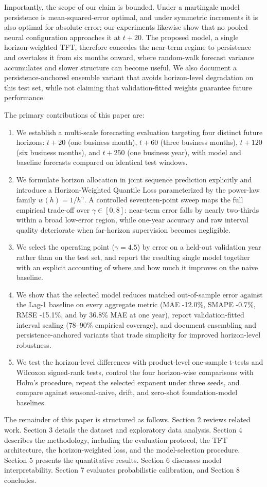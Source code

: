 \documentclass[review,3p,times]{elsarticle}
\begin{document}
Importantly, the scope of our claim is bounded. Under a martingale model persistence is mean-squared-error optimal, and under symmetric increments it is also optimal for absolute error; our experiments likewise show that no pooled neural configuration approaches it at $t+20$. The proposed model, a single horizon-weighted TFT, therefore concedes the near-term regime to persistence and overtakes it from six months onward, where random-walk forecast variance accumulates and slower structure can become useful. We also document a persistence-anchored ensemble variant that avoids horizon-level degradation on this test set, while not claiming that validation-fitted weights guarantee future performance.

The primary contributions of this paper are:
\begin{enumerate}
\item We establish a multi-scale forecasting evaluation targeting four distinct future horizons: $t+20$ (one business month), $t+60$ (three business months), $t+120$ (six business months), and $t+250$ (one business year), with model and baseline forecasts compared on identical test windows.
\item We formulate horizon allocation in joint sequence prediction explicitly and introduce a Horizon-Weighted Quantile Loss parameterized by the power-law family $w(h) = 1/h^\gamma$. A controlled seventeen-point sweep maps the full empirical trade-off over $\gamma \in [0, 8]$: near-term error falls by nearly two-thirds within a broad low-error region, while one-year accuracy and raw interval quality deteriorate when far-horizon supervision becomes negligible.
\item We select the operating point ($\gamma = 4.5$) by error on a held-out validation year rather than on the test set, and report the resulting single model together with an explicit accounting of where and how much it improves on the naive baseline.
\item We show that the selected model reduces matched out-of-sample error against the Lag-1 baseline on every aggregate metric (MAE -12.0\%, SMAPE -0.7\%, RMSE -15.1\%, and by 36.8\% MAE at one year), report validation-fitted interval scaling (78--90\% empirical coverage), and document ensembling and persistence-anchored variants that trade simplicity for improved horizon-level robustness.
\item We test the horizon-level differences with product-level one-sample t-tests and Wilcoxon signed-rank tests, control the four horizon-wise comparisons with Holm's procedure, repeat the selected exponent under three seeds, and compare against seasonal-naive, drift, and zero-shot foundation-model baselines.

\end{enumerate}
The remainder of this paper is structured as follows. Section 2 reviews related work. Section 3 details the dataset and exploratory data analysis. Section 4 describes the methodology, including the evaluation protocol, the TFT architecture, the horizon-weighted loss, and the model-selection procedure. Section 5 presents the quantitative results. Section 6 discusses model interpretability. Section 7 evaluates probabilistic calibration, and Section 8 concludes.
\end{document}
